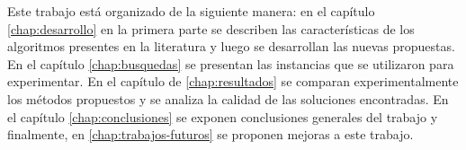 Este trabajo está organizado de la siguiente manera: en el capítulo \autoref{chap:desarrollo} en la primera parte se describen las características de los algoritmos presentes en la literatura y luego se desarrollan las nuevas propuestas. En el capítulo  \autoref{chap:busquedas} se presentan las instancias que se utilizaron para experimentar. En el capítulo de  \autoref{chap:resultados} se comparan experimentalmente los métodos propuestos y se analiza la calidad de las soluciones encontradas. En el capítulo  \autoref{chap:conclusiones} se exponen conclusiones generales del trabajo y finalmente, en \autoref{chap:trabajos-futuros} se proponen mejoras a este trabajo.
